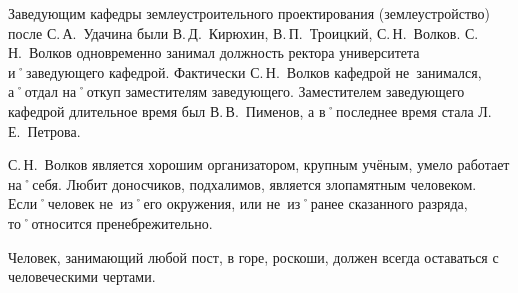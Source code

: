 

Заведующим кафедры землеустроительного проектирования (землеустройство) после С.\,А.~Удачина были В.\,Д.~Кирюхин, В.\,П.~Троицкий, С.\,Н.~Волков. С.\,Н.~Волков одновременно занимал должность ректора университета и˚заведующего кафедрой. Фактически С.\,Н.~Волков кафедрой не~занимался, а˚отдал на˚откуп заместителям заведующего. Заместителем заведующего кафедрой длительное время был В.\,В.~Пименов, а в˚последнее время стала Л.\,Е.~Петрова. 

С.\,Н.~Волков является хорошим организатором, крупным учёным, умело работает на˚себя. Любит доносчиков, подхалимов, является злопамятным человеком. Если˚человек не~из˚его окружения, или не~из˚ранее сказанного разряда, то˚относится пренебрежительно. 

Человек, занимающий любой пост, в горе, роскоши, должен всегда оставаться с человеческими чертами.